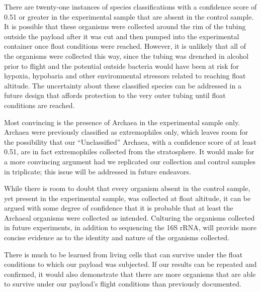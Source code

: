 There are twenty-one instances of species classifications with a confidence score of 0.51 or greater in the experimental sample that are absent in the control sample. It is possible that these organisms were collected around the rim of the tubing outside the payload after it was cut and then pumped into the experimental container once float conditions were reached. However, it is unlikely that all of the organisms were collected this way, since the tubing was drenched in alcohol prior to flight and the potential outside bacteria would have been at risk for hypoxia, hypobaria and other environmental stressors related to reaching float altitude. The uncertainty about these classified species can be addressed in a future design that affords protection to the very outer tubing until float conditions are reached.  


Most convincing is the presence of Archaea in the experimental sample only. Archaea were previously classified as extremophiles only, which leaves room for the possibility that our “Unclassified” Archaea, with a confidence score of at least 0.51, are in fact extremophiles collected from the stratosphere. It would make for a more convincing argument had we replicated our collection and control samples in triplicate; this issue will be addressed in future endeavors. 


While there is room to doubt that every organism absent in the control sample, yet present in the experimental sample, was collected at float altitude, it can be argued with some degree of confidence that it is probable that at least the Archaeal organisms were collected as intended. Culturing the organisms collected in future experiments, in addition to sequencing the 16S rRNA, will provide more concise evidence as to the identity and nature of the organisms collected.


There is much to be learned from living cells that can survive under the float conditions to which our payload was subjected. If our results can be repeated and confirmed, it would also demonstrate that there are more organisms that are able to survive under our payload’s flight conditions than previously documented. 


